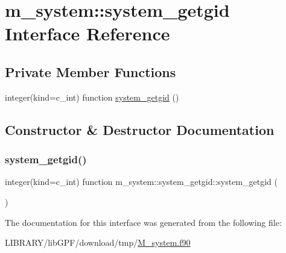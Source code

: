 \hypertarget{interfacem__system_1_1system__getgid}{}\section{m\+\_\+system\+:\+:system\+\_\+getgid Interface Reference}
\label{interfacem__system_1_1system__getgid}
\subsection*{Private Member Functions}
\begin{DoxyCompactItemize}
\item 
integer(kind=c\+\_\+int) function \hyperlink{interfacem__system_1_1system__getgid_aa1f2ceda993e2f36bf0cdc9cf28ea1d3}{system\+\_\+getgid} ()
\end{DoxyCompactItemize}


\subsection{Constructor \& Destructor Documentation}
\mbox{\label{interfacem__system_1_1system__getgid_aa1f2ceda993e2f36bf0cdc9cf28ea1d3}} 
\subsubsection{\texorpdfstring{system\+\_\+getgid()}{system\_getgid()}}
{\footnotesize\ttfamily integer(kind=c\+\_\+int) function m\+\_\+system\+::system\+\_\+getgid\+::system\+\_\+getgid (\begin{DoxyParamCaption}{ }\end{DoxyParamCaption})\hspace{0.3cm}{\ttfamily [private]}}



The documentation for this interface was generated from the following file\+:\begin{DoxyCompactItemize}
\item 
L\+I\+B\+R\+A\+R\+Y/lib\+G\+P\+F/download/tmp/\hyperlink{M__system_8f90}{M\+\_\+system.\+f90}\end{DoxyCompactItemize}
